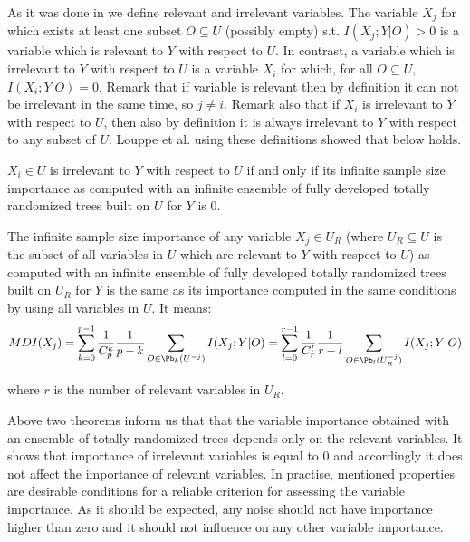 As it was done in \cite{kohavi1997importance} we define relevant and irrelevant variables. The variable $X_j$ for which exists at least one subset $O \subseteq U$ (possibly empty) s.t. $I(X_j;Y|O) > 0$ is a variable which is relevant to $Y$ with respect to $U$. In contrast, a variable which is irrelevant to $Y$ with respect to $U$ is a variable $X_i$ for which, for all 
 $O \subseteq U$, $I(X_i;Y|O) = 0$. Remark that if variable is relevant then by definition it can not be irrelevant in the same time, so $j \neq i$. Remark also that if $X_i$ is irrelevant to $Y$ with respect to $U$, then also by definition it is always irrelevant to $Y$ with respect to any subset of $U$. Louppe et al. using these definitions showed that below holds.

\begin{theorem}
	$X_i \in U$ is irrelevant to $Y$ with respect to $U$ if and only if its infinite sample size
	importance as computed with an infinite ensemble of fully developed totally randomized trees
	built on $U$ for $Y$ is 0.
\end{theorem}

\begin{theorem}
	 The infinite sample size importance of any variable $X_j \in U_R$ (where $U_R \subseteq U$ is the subset of all variables in $U$ which are relevant to $Y$ with respect to $U$) as computed with an infinite ensemble of fully developed totally randomized trees built on $U_R$ for $Y$ is the same as its importance computed in the same conditions by using all variables in $U$. It means:
\begin{equation}
	{MDI}( X_{j} ) = \displaystyle \sum_{k=0}^{p-1}\frac{1}{C^k_p}\frac{1}{p-k} \displaystyle\sum_{O \in \Pb_{k}(U^{-j})} I(X_j;Y|O) = 
	\displaystyle \sum_{l=0}^{r-1}\frac{1}{C^l_r}\frac{1}{r-l} \displaystyle\sum_{O \in \Pb_{l}(U^{-j}_R)} I(X_j;Y|O)
\end{equation}
\end{theorem}
 where $r$ is the number of relevant variables in $U_R$.
 \newline
 
Above two theorems inform us that that the variable importance obtained with an ensemble of totally randomized trees depends only on the relevant variables. It shows that importance of irrelevant variables is equal to 0 and accordingly it does not affect the importance of relevant variables. 
In practise, mentioned properties are desirable conditions for a reliable criterion for assessing the variable importance. As it should be expected, any noise should not have importance higher than zero and it should not influence on any other variable importance.

